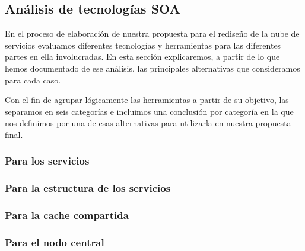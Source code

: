 \subsection{Análisis de tecnologías SOA}
\label{soa:tecnologias}

En el proceso de elaboración de nuestra propuesta para el rediseño de la nube de servicios evaluamos diferentes tecnologías y herramientas para las diferentes partes en ella involucradas. En esta sección explicaremos, a partir de lo que hemos documentado de ese análisis, las principales alternativas que consideramos para cada caso.

Con el fin de agrupar lógicamente las herramientas a partir de su objetivo, las separamos en seis categorías e incluimos una conclusión por categoría en la que nos definimos por una de esas alternativas para utilizarla en nuestra propuesta final.

\subsubsection{Para los servicios}
\label{soa:tecnologias:para-servicios}






\subsubsection{Para la estructura de los servicios}
\label{soa:tecnologias:para-estructura}






\subsubsection{Para la cache compartida}
\label{soa:tecnologias:para-cache-compartida}





\subsubsection{Para el nodo central}
\label{soa:tecnologias:para-nodo-central}

